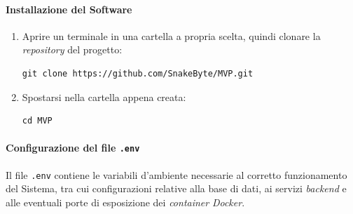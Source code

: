 \documentclass[10pt, letterpaper]{article}
\begin{document}
\paragraph{Installazione del Software}

\begin{enumerate}
    \item Aprire un terminale in una cartella a propria scelta, quindi clonare 
    la \textit{repository} del progetto:
\begin{verbatim}
git clone https://github.com/SnakeByte/MVP.git
\end{verbatim}
    \item Spostarsi nella cartella appena creata:
\begin{verbatim}
cd MVP
\end{verbatim}
\end{enumerate}

\paragraph{Configurazione del file \texttt{.env}}
Il file \texttt{.env} contiene le variabili d'ambiente necessarie al corretto funzionamento del Sistema, 
tra cui configurazioni relative alla base di dati, ai servizi \textit{backend} e alle eventuali porte di esposizione dei \textit{container} \textit{Docker}.
\end{document}
